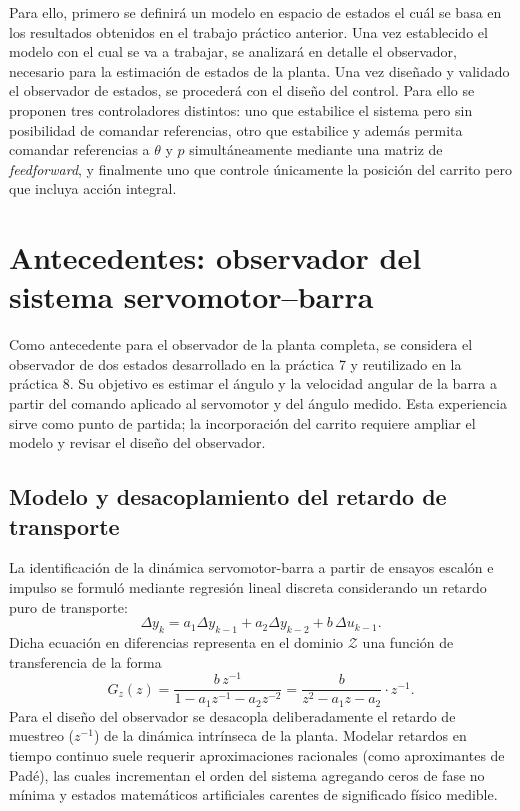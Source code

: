 \documentclass[a4paper, twoside, 10pt, spanish]{article}
\numberwithin{table}{section}
\begin{document}
Para ello, primero se definirá un modelo en espacio de estados el cuál se basa en los resultados obtenidos en el trabajo práctico anterior. Una vez establecido el modelo con el cual se va a trabajar, se analizará en detalle el observador, necesario para la estimación de estados de la planta. 
Una vez diseñado y validado el observador de estados, se procederá con el diseño del control. Para ello se proponen tres controladores distintos: uno que estabilice el sistema pero sin posibilidad de comandar referencias, otro que estabilice y además permita comandar referencias a $\theta$ y $p$ simultáneamente mediante una matriz de \textit{feedforward}, y finalmente uno que controle únicamente la posición del carrito pero que incluya acción integral.

\section{Antecedentes: observador del sistema servomotor--barra}
\label{sec:observador-servo-barra}

Como antecedente para el observador de la planta completa, se considera el observador de dos estados desarrollado en la práctica 7 y reutilizado en la práctica 8. Su objetivo es estimar el ángulo y la velocidad angular de la barra a partir del comando aplicado al servomotor y del ángulo medido. Esta experiencia sirve como punto de partida; la incorporación del carrito requiere ampliar el modelo y revisar el diseño del observador.

\subsection{Modelo y desacoplamiento del retardo de transporte}
La identificación de la dinámica servomotor-barra a partir de ensayos escalón e impulso se formuló mediante regresión lineal discreta considerando un retardo puro de transporte:
\begin{equation}
\Delta y_k = a_1\Delta y_{k-1} + a_2\Delta y_{k-2} + b\,\Delta u_{k-1}.
\end{equation}
Dicha ecuación en diferencias representa en el dominio $\mathcal{Z}$ una función de transferencia de la forma
\begin{equation}
G_z(z) = \frac{b\,z^{-1}}{1 - a_1 z^{-1} - a_2 z^{-2}} = \frac{b}{z^2 - a_1 z - a_2} \cdot z^{-1}.
\end{equation}
Para el diseño del observador se desacopla deliberadamente el retardo de muestreo ($z^{-1}$) de la dinámica intrínseca de la planta. Modelar retardos en tiempo continuo suele requerir aproximaciones racionales (como aproximantes de Padé), las cuales incrementan el orden del sistema agregando ceros de fase no mínima y estados matemáticos artificiales carentes de significado físico medible. 
\end{document}
